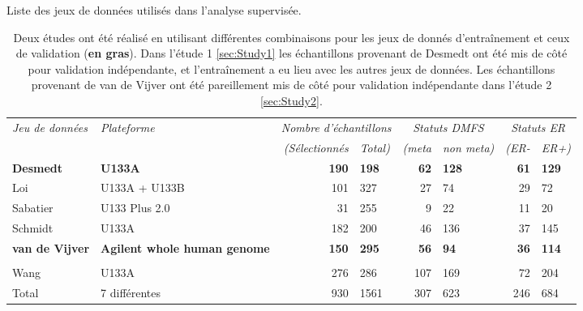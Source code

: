     \begin{table}
        \begin{center}
          \caption{Liste des jeux de données utilisés dans l'analyse supervisée.}
          \begin{tabular}{llr@{/}lr@{/}lr@{/}l}
            \toprule
            \emph{Jeu de données} & \emph{Plateforme} & \multicolumn{2}{c}{\emph{Nombre d'échantillons}} & \multicolumn{2}{c}{\emph{Statuts DMFS}} & \multicolumn{2}{c}{\emph{Statuts ER}} \\
            \cmidrule(r){3-8}
            &  & \emph{(Sélectionnés} & \emph{Total)}           & \emph{(meta} & \emph{non meta)} & \emph{(ER-}     & \emph{ER+)} \\
            \midrule
            \textbf{Desmedt}          & \textbf{U133A}          & \textbf{190} & \textbf{198} & \textbf{62} & \textbf{128} & \textbf{61} & \textbf{129} \\
            Loi                       & U133A + U133B           & 101 & 327                   & 27 & 74                & 29 & 72            \\
            Sabatier                  & U133 Plus 2.0           & 31 & 255                    & 9 & 22                 & 11 & 20            \\
            Schmidt                   & U133A                   & 182 & 200                   & 46 & 136               & 37 & 145           \\
            \textbf{van de Vijver}    & \multirow{2}{2.49cm}{\textbf{Agilent whole human genome}}  & \textbf{150} & \textbf{295} & \textbf{56} & \textbf{94}  & \textbf{36} & \textbf{114} \\
            & \\
            Wang                      & U133A                   & 276 & 286                   & 107 & 169              & 72 & 204           \\
            \midrule
            Total                     & 7 différentes           & 930 & 1561                  & 307 & 623              & 246 & 684          \\
            \bottomrule
          \end{tabular}
          \label{tab:Res2Data}
          \vspace{5ex}
          \caption*{Deux études ont été réalisé en utilisant différentes combinaisons pour les jeux de donnés d'entraînement et ceux de validation (\textbf{en gras}). Dans l'étude 1 \ref{sec:Study1} les échantillons provenant de Desmedt ont été mis de côté pour validation indépendante, et l'entraînement a eu lieu avec les autres jeux de données. Les échantillons provenant de van de Vijver ont été pareillement mis de côté pour validation indépendante dans l'étude 2 \ref{sec:Study2}.}
        \end{center}
      \end{table}



